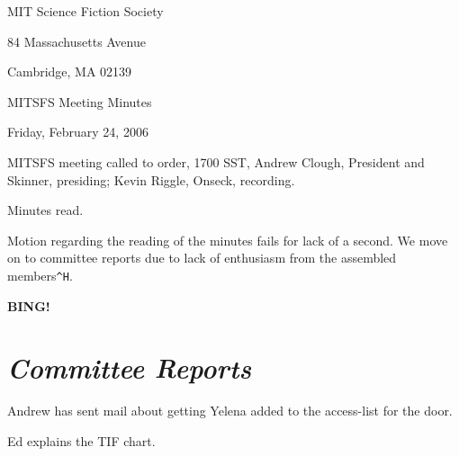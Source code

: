 \documentclass[10pt]{article}
\newcommand{\bing}{{\bf BING!} }
\newcommand{\goto}[1]{\bing \vskip 12pt \section*{{\em{#1}}}}
\begin{document}
\begin{center}

MIT Science Fiction Society

84 Massachusetts Avenue

Cambridge, MA 02139

\vspace{12pt}

MITSFS Meeting Minutes

Friday, February 24, 2006

\end{center}

\vspace{18pt}

\setlength{\parskip}{6pt}

\noindent
MITSFS meeting called to order, 1700 SST,
Andrew Clough, President and Skinner, presiding; Kevin Riggle, Onseck, recording.

Minutes read.

Motion regarding the reading of the minutes fails for lack of a second.  We move on to committee
reports due to lack of enthusiasm from the assembled members\texttt{^H}.

\goto{Committee Reports}

Andrew has sent mail about getting Yelena added to the access-list for the door.

Ed explains the TIF chart.





\end{document}
